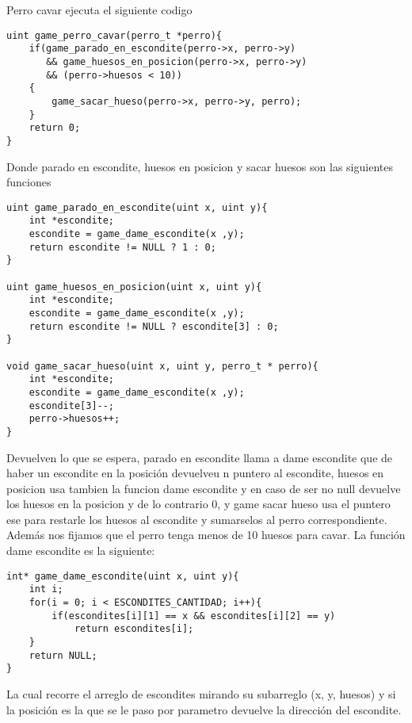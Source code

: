 Perro cavar ejecuta el siguiente codigo

\begin{codesnippet}
\begin{verbatim}
uint game_perro_cavar(perro_t *perro){
    if(game_parado_en_escondite(perro->x, perro->y) 
       && game_huesos_en_posicion(perro->x, perro->y) 
       && (perro->huesos < 10))
    {
        game_sacar_hueso(perro->x, perro->y, perro);
    }
    return 0;
}
\end{verbatim}
\end{codesnippet}

Donde parado en escondite, huesos en posicion y sacar huesos son las siguientes funciones

\begin{codesnippet}
\begin{verbatim}
uint game_parado_en_escondite(uint x, uint y){
    int *escondite;
    escondite = game_dame_escondite(x ,y);
    return escondite != NULL ? 1 : 0;
}

uint game_huesos_en_posicion(uint x, uint y){
    int *escondite;
    escondite = game_dame_escondite(x ,y);
    return escondite != NULL ? escondite[3] : 0;
}

void game_sacar_hueso(uint x, uint y, perro_t * perro){
    int *escondite;
    escondite = game_dame_escondite(x ,y);
    escondite[3]--;
    perro->huesos++;
}
\end{verbatim}
\end{codesnippet}

Devuelven lo que se espera, parado en escondite llama a dame escondite que de haber un escondite en la posición devuelveu n puntero al escondite, huesos en posicion usa tambien la funcion dame escondite y en caso de ser no null devuelve los huesos en la posicion
y de lo contrario 0, y game sacar hueso usa el puntero ese para restarle los huesos al escondite y sumarselos al perro correspondiente. Además nos fijamos que el perro tenga menos de 10 huesos para cavar. La función dame escondite es la siguiente:

\begin{codesnippet}
\begin{verbatim}
int* game_dame_escondite(uint x, uint y){
    int i;
    for(i = 0; i < ESCONDITES_CANTIDAD; i++){
        if(escondites[i][1] == x && escondites[i][2] == y)
            return escondites[i];
    }
    return NULL;
}
\end{verbatim}
\end{codesnippet}

La cual recorre el arreglo de escondites mirando su subarreglo (x, y, huesos) y si la posición es la que se le paso por parametro devuelve la dirección del escondite.